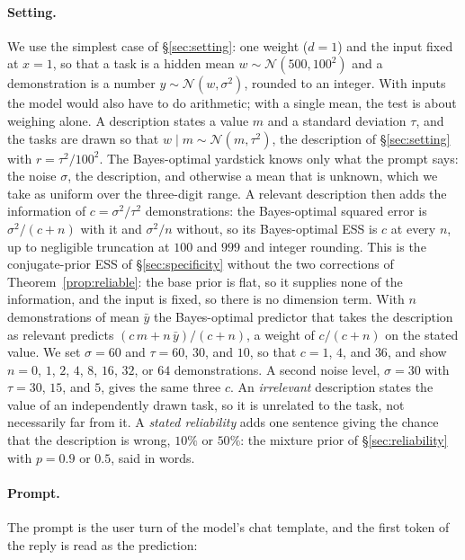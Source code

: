 \documentclass{article}
\begin{document}
\paragraph{Setting.} We use the simplest case of \S\ref{sec:setting}: one weight ($d = 1$) and the input fixed at $x = 1$, so that a task is a hidden mean $w \sim \mathcal{N}(500, 100^2)$ and a demonstration is a number $y \sim \mathcal{N}(w, \sigma^2)$, rounded to an integer. With inputs the model would also have to do arithmetic; with a single mean, the test is about weighing alone. A description states a value $m$ and a standard deviation $\tau$, and the tasks are drawn so that $w \mid m \sim \mathcal{N}(m, \tau^2)$, the description of \S\ref{sec:setting} with $r = \tau^2 / 100^2$. The Bayes-optimal yardstick knows only what the prompt says: the noise $\sigma$, the description, and otherwise a mean that is unknown, which we take as uniform over the three-digit range. A relevant description then adds the information of $c = \sigma^2 / \tau^2$ demonstrations: the Bayes-optimal squared error is $\sigma^2/(c+n)$ with it and $\sigma^2/n$ without, so its Bayes-optimal ESS is $c$ at every $n$, up to negligible truncation at $100$ and $999$ and integer rounding. This is the conjugate-prior ESS of \S\ref{sec:specificity} without the two corrections of Theorem~\ref{prop:reliable}: the base prior is flat, so it supplies none of the information, and the input is fixed, so there is no dimension term. With $n$ demonstrations of mean $\bar y$ the Bayes-optimal predictor that takes the description as relevant predicts $(c\,m + n\,\bar y)/(c + n)$, a weight of $c/(c+n)$ on the stated value. We set $\sigma = 60$ and $\tau = 60$, $30$, and $10$, so that $c = 1$, $4$, and $36$, and show $n = 0$, $1$, $2$, $4$, $8$, $16$, $32$, or $64$ demonstrations. A second noise level, $\sigma = 30$ with $\tau = 30$, $15$, and $5$, gives the same three $c$. An \emph{irrelevant} description states the value of an independently drawn task, so it is unrelated to the task, not necessarily far from it. A \emph{stated reliability} adds one sentence giving the chance that the description is wrong, $10\%$ or $50\%$: the mixture prior of \S\ref{sec:reliability} with $p = 0.9$ or $0.5$, said in words.

\paragraph{Prompt.} The prompt is the user turn of the model's chat template, and the first token of the reply is read as the prediction:
\end{document}
